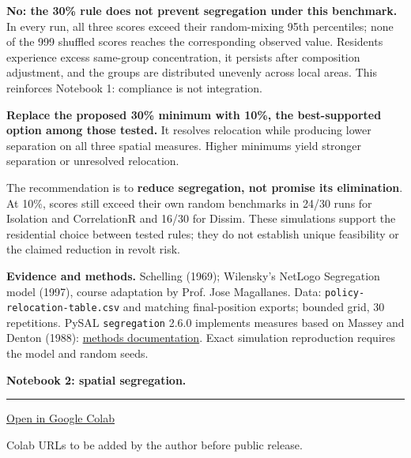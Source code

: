 \documentclass[10pt,a4paper]{article}
\newcommand{\PolicyNotebookURL}{}
\newcommand{\briefhead}[1]{\par\vspace{5pt}{\large\bfseries\color{ink}#1}\par\vspace{1pt}}
\begin{document}
\textbf{No: the 30\% rule does not prevent segregation under this benchmark.} In every run, all three scores exceed their random-mixing 95th percentiles; none of the 999 shuffled scores reaches the corresponding observed value. Residents experience excess same-group concentration, it persists after composition adjustment, and the groups are distributed unevenly across local areas. This reinforces Notebook 1: compliance is not integration.

\briefhead{Policy recommendation}
\textbf{Replace the proposed 30\% minimum with 10\%, the best-supported option among those tested.} It resolves relocation while producing lower separation on all three spatial measures. Higher minimums yield stronger separation or unresolved relocation.

The recommendation is to \textbf{reduce segregation, not promise its elimination}. At 10\%, scores still exceed their own random benchmarks in 24/30 runs for Isolation and CorrelationR and 16/30 for Dissim. These simulations support the residential choice between tested rules; they do not establish unique feasibility or the claimed reduction in revolt risk.

\vfill
{\footnotesize\color{muted}
\textbf{Evidence and methods.} Schelling (1969); Wilensky's NetLogo Segregation model (1997), course adaptation by Prof. Jose Magallanes. Data: \texttt{policy-relocation-table.csv} and matching final-position exports; bounded grid, 30 repetitions. PySAL \texttt{segregation} 2.6.0 implements measures based on Massey and Denton (1988): \href{https://pysal.org/segregation/api.html}{methods documentation}. Exact simulation reproduction requires the model and random seeds.\par
\textbf{Notebook 2: spatial segregation.} \ifx\PolicyNotebookURL\empty\rule{5cm}{0.3pt}\else\href{\PolicyNotebookURL}{Open in Google Colab}\fi\par
Colab URLs to be added by the author before public release.
}
\end{document}
